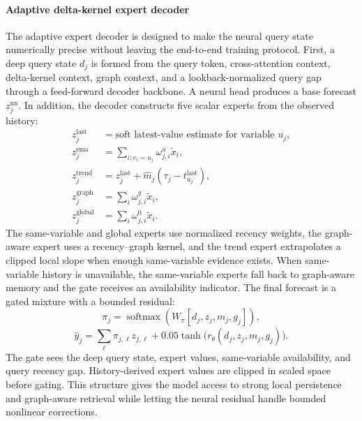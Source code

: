 \documentclass[preprint,12pt]{elsarticle}
\begin{document}
\paragraph{Adaptive delta-kernel expert decoder}
The adaptive expert decoder is designed to make the neural query state
numerically precise without leaving the end-to-end training protocol. First, a
deep query state $d_j$ is formed from the query token, cross-attention context,
delta-kernel context, graph context, and a lookback-normalized query gap through
a feed-forward decoder backbone. A neural head produces a base forecast
$z^{\mathrm{nn}}_j$. In addition, the decoder constructs five scalar experts from the observed
history:
\begin{align}
z^{\mathrm{last}}_j &= \text{soft latest-value estimate for variable }u_j,\\
z^{\mathrm{ema}}_j &= \sum_{i:v_i=u_j} \omega_{j,i}^{u}\widetilde x_i,\\
z^{\mathrm{trend}}_j &= z^{\mathrm{last}}_j +
    \widehat m_j(\tau_j-t^{\mathrm{last}}_{u_j}),\\
z^{\mathrm{graph}}_j &= \sum_i \omega_{j,i}^{g}\widetilde x_i,\\
z^{\mathrm{global}}_j &= \sum_i \omega_{j,i}^{0}\widetilde x_i.
\end{align}
The same-variable and global experts use normalized recency weights, the
graph-aware expert uses a recency--graph kernel, and the trend expert
extrapolates a clipped local slope when enough same-variable evidence exists.
When same-variable history is unavailable, the same-variable experts fall back
to graph-aware memory and the gate receives an availability indicator. The final forecast is a gated mixture with a bounded residual:
\begin{equation}
    \pi_j=\operatorname{softmax}\left(W_\pi[d_j,z_j,m_j,g_j]\right),
\end{equation}
\begin{equation}
    \widehat y_j
    = \sum_{\ell}\pi_{j,\ell}z_{j,\ell}
    + 0.05\tanh\bigl(r_\theta(d_j,z_j,m_j,g_j)\bigr).
\end{equation}
The gate sees the deep query state, expert values, same-variable availability,
and query recency gap. History-derived expert values are clipped in scaled
space before gating. This structure gives the model access to strong local
persistence and graph-aware retrieval while letting the neural residual handle
bounded nonlinear corrections.
\end{document}
